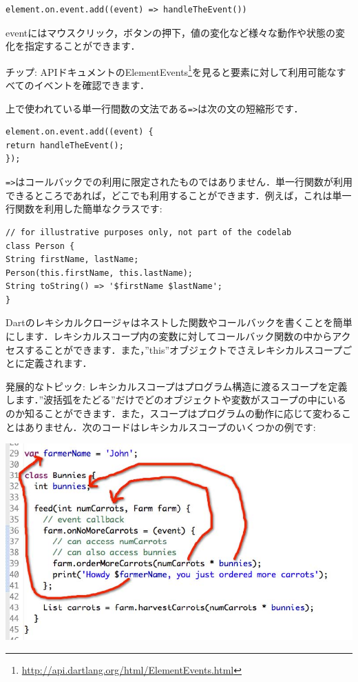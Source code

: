 \begin{verbatim}
element.on.event.add((event) => handleTheEvent())
\end{verbatim}

eventにはマウスクリック，ボタンの押下，値の変化など様々な動作や状態の変化を指定することができます．

チップ: APIドキュメントのElementEvents\footnote{\url{http://api.dartlang.org/html/ElementEvents.html}}を見ると要素に対して利用可能なすべてのイベントを確認できます．

上で使われている単一行間数の文法である\verb|=>|は次の文の短縮形です．

\begin{verbatim}
element.on.event.add((event) {
return handleTheEvent();
});
\end{verbatim}

\verb|=>|はコールバックでの利用に限定されたものではありません．単一行関数が利用できるところであれば，どこでも利用することができます．例えば，これは単一行関数を利用した簡単なクラスです:

\begin{verbatim}
// for illustrative purposes only, not part of the codelab
class Person {
String firstName, lastName;
Person(this.firstName, this.lastName);
String toString() => '$firstName $lastName';
}
\end{verbatim}

Dartのレキシカルクロージャはネストした関数やコールバックを書くことを簡単にします．レキシカルスコープ内の変数に対してコールバック関数の中からアクセスすることができます．また，''this''オブジェクトでさえレキシカルスコープごとに定義されます．

発展的なトピック: レキシカルスコープはプログラム構造に渡るスコープを定義します．''波括弧をたどる''だけでどのオブジェクトや変数がスコープの中にいるのか知ることができます．また，スコープはプログラムの動作に応じて変わることはありません．次のコードはレキシカルスコープのいくつかの例です:

\includegraphics{step4/img_45.jpg}

